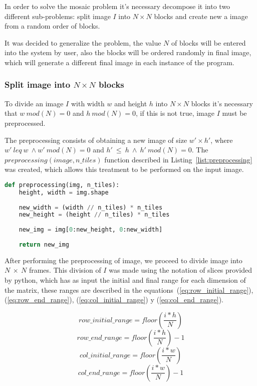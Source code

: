 \documentclass[journal]{IEEEtran}
\begin{document}
In order to solve the mosaic problem it's necessary decompose it into two different sub-problems: split image $I$ into $N\times N$ blocks and create new a image from a random order of blocks. 

It was decided to generalize the problem, the value $N$ of blocks will be entered into the system by user, also the blocks will be ordered randomly in final image, which will generate a different final image in each instance of the program.

\subsubsection{Split image into $N\times N$  blocks}
To divide an image $I$ with width $w$ and height $h$ into $N \times N$ blocks it's necessary that $w~mod(N) = 0$ and $h~mod(N) = 0$, if this is not true, image $I$ must be preprocessed. 

The preprocessing consists of obtaining a new image of size $ w' \times h' $, where $ w' ~leq~w~\wedge w'~mod(N)=0 $ and $h'~\leq~h~\wedge~h'~mod(N)=0$. The $ preprocessing(image, n\_tiles) $ function described in Listing~\ref{list:preprocessing} was created, which allows this treatment to be performed on the input image.

\begin{lstlisting}[language=Python, caption=Image preprocessing, label=list:preprocessing]
def preprocessing(img, n_tiles):
	height, width = img.shape
	
	new_width = (width // n_tiles) * n_tiles
	new_height = (height // n_tiles) * n_tiles
	
	new_img = img[0:new_height, 0:new_width]
	
	return new_img
\end{lstlisting}

After performing the preprocessing of image, we proceed to divide image into $N~\times~N$ frames. This division of $I$ was made using the notation of slices provided by python, which has as input the initial and final range for each dimension of the matrix, these ranges are described in the equations~(\ref{eq:row_initial_range}), (\ref{eq:row_end_range}), (\ref{eq:col_initial_range}) y (\ref{eq:col_end_range}).

\begin{equation}\label{eq:row_initial_range}
	row\_initial\_range = floor\left(\dfrac{i * h}{N}\right)
\end{equation}
\begin{equation}\label{eq:row_end_range}
	row\_end\_range = floor\left(\dfrac{i * h}{N}\right) - 1
\end{equation}
\begin{equation}\label{eq:col_initial_range}
	col\_initial\_range =floor\left(\dfrac{i * w}{N}\right)
\end{equation}
\begin{equation}\label{eq:col_end_range}
	col\_end\_range = floor\left(\dfrac{i * w}{N}\right) - 1
\end{equation}
\end{document}
